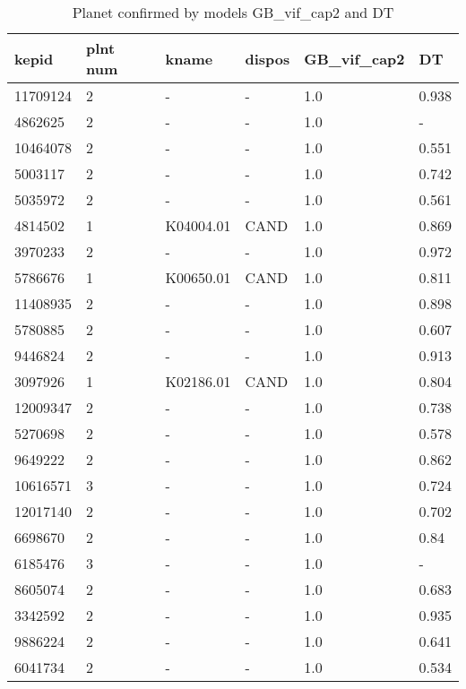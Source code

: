 \begin{table}[!htbp]
 \centering
 \caption{Planet confirmed by models GB\_vif\_cap2 and DT}
 \label{dataGBvifcap2DTcreftab} 
  \begin{tabular}
{| 
 p{}| 
 p{}| 
 p{}| 
 p{}| 
 p{}| 
 p{}| 
}\hline 
\textbf{kepid} &\textbf{plnt num} &\textbf{kname} &\textbf{dispos} &\textbf{GB\_vif\_cap2} &\textbf{DT} \\ \hline 
11709124 &2 &- &- &1.0 &0.938 \\ \hline 
4862625 &2 &- &- &1.0 &- \\ \hline 
10464078 &2 &- &- &1.0 &0.551 \\ \hline 
5003117 &2 &- &- &1.0 &0.742 \\ \hline 
5035972 &2 &- &- &1.0 &0.561 \\ \hline 
4814502 &1 &K04004.01 &CAND &1.0 &0.869 \\ \hline 
3970233 &2 &- &- &1.0 &0.972 \\ \hline 
5786676 &1 &K00650.01 &CAND &1.0 &0.811 \\ \hline 
11408935 &2 &- &- &1.0 &0.898 \\ \hline 
5780885 &2 &- &- &1.0 &0.607 \\ \hline 
9446824 &2 &- &- &1.0 &0.913 \\ \hline 
3097926 &1 &K02186.01 &CAND &1.0 &0.804 \\ \hline 
12009347 &2 &- &- &1.0 &0.738 \\ \hline 
5270698 &2 &- &- &1.0 &0.578 \\ \hline 
9649222 &2 &- &- &1.0 &0.862 \\ \hline 
10616571 &3 &- &- &1.0 &0.724 \\ \hline 
12017140 &2 &- &- &1.0 &0.702 \\ \hline 
6698670 &2 &- &- &1.0 &0.84 \\ \hline 
6185476 &3 &- &- &1.0 &- \\ \hline 
8605074 &2 &- &- &1.0 &0.683 \\ \hline 
3342592 &2 &- &- &1.0 &0.935 \\ \hline 
9886224 &2 &- &- &1.0 &0.641 \\ \hline 
6041734 &2 &- &- &1.0 &0.534 \\ \hline 

\end{tabular}
\end{table}
